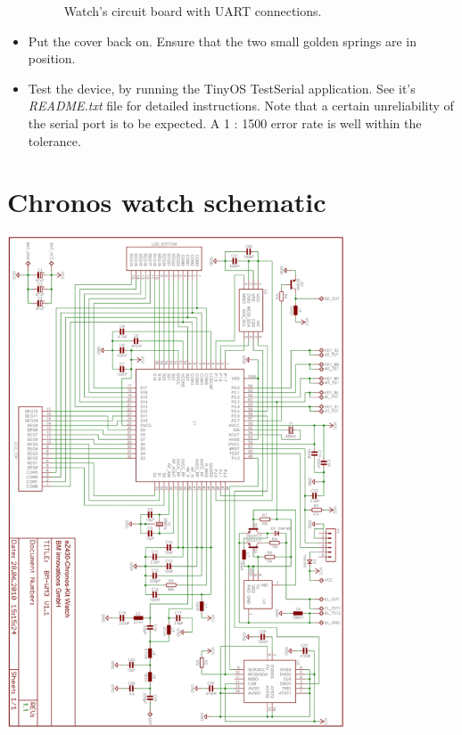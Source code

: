 \begin{itemize}
\begin{figure}[h]
      \caption{Watch's circuit board with UART connections.}
      \label{fig:chronos_with_wires}
    \end{figure}
  \item Put the cover back on. Ensure that the two small golden springs
    are in position.
  \item Test the device, by running the TinyOS TestSerial application. See
    it's \emph{README.txt} file for detailed instructions.  Note that
    a certain unreliability of the serial port is to be expected. A 1 :
    1500 error rate is well within the tolerance.
\end{itemize}


\chapter{Chronos watch schematic}
\label{appendix:watch_schematics}

\centering
\includegraphics[width=0.75\textwidth]{img/watch_schematics.png}


% 



